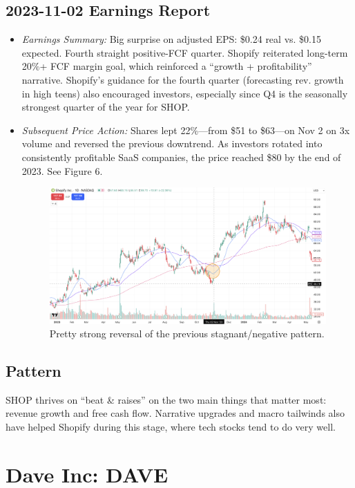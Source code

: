 \documentclass[11pt]{article}
\begin{document}
    \subsection{2023-11-02 Earnings Report} 
        \begin{itemize}
            \item \textit{Earnings Summary:} Big surprise on adjusted EPS: \$0.24 real vs. \$0.15 expected. Fourth straight positive-FCF quarter. Shopify reiterated long-term 20\%+ FCF margin goal, which reinforced a ``growth + profitability'' narrative. Shopify's guidance for the fourth quarter (forecasting rev. growth in high teens) also encouraged investors, especially since Q4 is the seasonally strongest quarter of the year for SHOP.
            \item \textit{Subsequent Price Action:} Shares lept 22\%---from \$51 to \$63---on Nov 2 on 3x volume and reversed the previous downtrend. As investors rotated into consistently profitable SaaS companies, the price reached \$80 by the end of 2023. See Figure 6.
            \begin{figure}[h]
                \centering \includegraphics[width=0.8\linewidth]{images/SHOP2.png}
                \caption{Pretty strong reversal of the previous stagnant/negative pattern.}
            \end{figure}
        \end{itemize}
    \subsection{Pattern}
        SHOP thrives on ``beat \& raises'' on the two main things that matter most: revenue growth and free cash flow. Narrative upgrades and macro tailwinds also have helped Shopify during this stage, where tech stocks tend to do very well.
\section{Dave Inc: DAVE}
\end{document}
